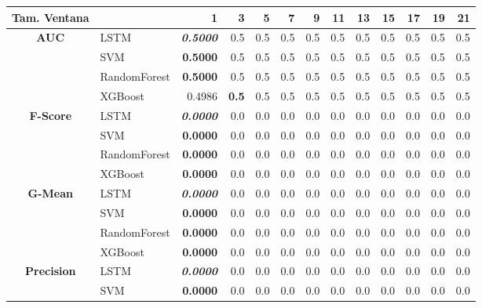 \begin{table}[H]
	\centering
	\begin{adjustbox}{max width=12cm}
		\begin{tabular}{|c|l|r|r|r|r|r|r|r|r|r|r|r|}
			\hline
			\textbf{Tam. Ventana} &         &      1  &   3  &   5  &   7  &   9  &   11 &   13 &   15 &   17 &   19 &   21 \\
			\hline
			\textbf{AUC} &  LSTM & \textit{ \textbf{  0.5000 } } &  0.5 &  0.5 &  0.5 &  0.5 &  0.5 &  0.5 &  0.5 &  0.5 &  0.5 &  0.5 \\
			&  SVM & \textbf{  0.5000 } &  0.5 &  0.5 &  0.5 &  0.5 &  0.5 &  0.5 &  0.5 &  0.5 &  0.5 &  0.5 \\
			&  RandomForest & \textbf{  0.5000 } &  0.5 &  0.5 &  0.5 &  0.5 &  0.5 &  0.5 &  0.5 &  0.5 &  0.5 &  0.5 \\
			&  XGBoost &  0.4986 & \textbf{  0.5 } &  0.5 &  0.5 &  0.5 &  0.5 &  0.5 &  0.5 &  0.5 &  0.5 &  0.5 \\
			\hline
			\textbf{F-Score} &  LSTM & \textit{ \textbf{  0.0000 } } &  0.0 &  0.0 &  0.0 &  0.0 &  0.0 &  0.0 &  0.0 &  0.0 &  0.0 &  0.0 \\
			&  SVM & \textbf{  0.0000 } &  0.0 &  0.0 &  0.0 &  0.0 &  0.0 &  0.0 &  0.0 &  0.0 &  0.0 &  0.0 \\
			&  RandomForest & \textbf{  0.0000 } &  0.0 &  0.0 &  0.0 &  0.0 &  0.0 &  0.0 &  0.0 &  0.0 &  0.0 &  0.0 \\
			&  XGBoost & \textbf{  0.0000 } &  0.0 &  0.0 &  0.0 &  0.0 &  0.0 &  0.0 &  0.0 &  0.0 &  0.0 &  0.0 \\
			\hline
			\textbf{G-Mean} &  LSTM & \textit{ \textbf{  0.0000 } } &  0.0 &  0.0 &  0.0 &  0.0 &  0.0 &  0.0 &  0.0 &  0.0 &  0.0 &  0.0 \\
			&  SVM & \textbf{  0.0000 } &  0.0 &  0.0 &  0.0 &  0.0 &  0.0 &  0.0 &  0.0 &  0.0 &  0.0 &  0.0 \\
			&  RandomForest & \textbf{  0.0000 } &  0.0 &  0.0 &  0.0 &  0.0 &  0.0 &  0.0 &  0.0 &  0.0 &  0.0 &  0.0 \\
			&  XGBoost & \textbf{  0.0000 } &  0.0 &  0.0 &  0.0 &  0.0 &  0.0 &  0.0 &  0.0 &  0.0 &  0.0 &  0.0 \\ 
			\hline
			\textbf{Precision} &  LSTM & \textit{ \textbf{  0.0000 } } &  0.0 &  0.0 &  0.0 &  0.0 &  0.0 &  0.0 &  0.0 &  0.0 &  0.0 &  0.0 \\
			&  SVM & \textbf{  0.0000 } &  0.0 &  0.0 &  0.0 &  0.0 &  0.0 &  0.0 &  0.0 &  0.0 &  0.0 &  0.0 \\

\end{tabular}
\end{adjustbox}
\end{table}
